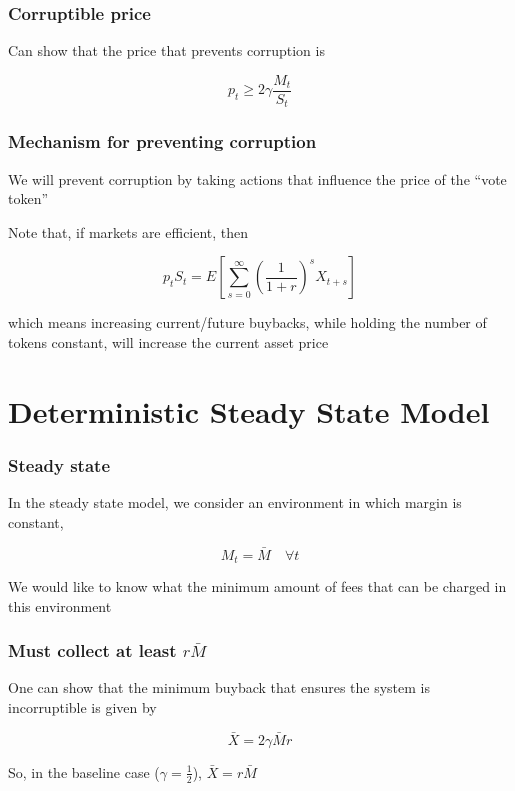 \documentclass[10pt]{beamer}
\begin{document}
  \begin{frame} \frametitle{Corruptible price}

    Can show that the price that prevents corruption is

    $$p_t \geq 2 \gamma \frac{M_t}{S_t}$$

  \end{frame}

  \begin{frame} \frametitle{Mechanism for preventing corruption}

    We will prevent corruption by taking actions that influence the price of the ``vote token''

    \vspace{0.25cm}

    Note that, if markets are efficient, then

    $$p_t S_t = E \left[ \sum_{s=0}^{\infty} \left(\frac{1}{1+r} \right)^s X_{t+s} \right]$$

    which means increasing current/future buybacks, while holding the number of tokens constant,
    will increase the current asset price

  \end{frame}


\section{Deterministic Steady State Model}

  \begin{frame} \frametitle{Steady state}

    In the steady state model, we consider an environment in which margin is constant,

    $$M_t = \bar{M} \quad \forall t$$

    We would like to know what the minimum amount of fees that can be charged in this environment

  \end{frame}

  \begin{frame} \frametitle{Must collect at least $r \bar{M}$}

    One can show that the minimum buyback that ensures the system is incorruptible is given by

    $$\bar{X} = 2 \gamma \bar{M} r$$

    So, in the baseline case ($\gamma = \frac{1}{2}$),  $\bar{X} = r \bar{M}$

  \end{frame}
\end{document}
